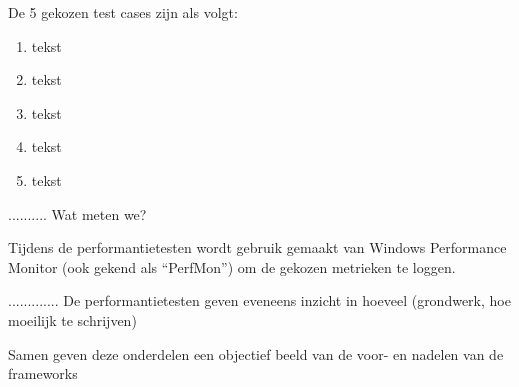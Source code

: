 
De 5 gekozen test cases zijn als volgt:

\begin{enumerate}
    \item tekst
    \item tekst
    \item tekst
    \item tekst
    \item tekst
\end{enumerate}

.......... Wat meten we?

Tijdens de performantietesten wordt gebruik gemaakt van Windows \textsuperscript{\textregistered} Performance Monitor (ook gekend als ``PerfMon'') om de gekozen metrieken te loggen.


............. De performantietesten geven eveneens inzicht in hoeveel (grondwerk, hoe moeilijk te schrijven)

Samen geven deze onderdelen een objectief beeld van de voor- en nadelen van de frameworks

